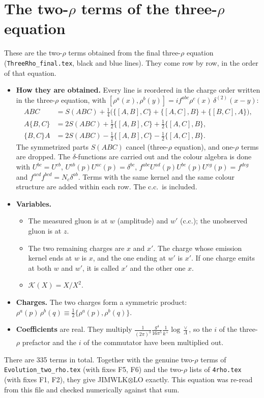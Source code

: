 \documentclass[9pt]{article}
\begin{document}
\section*{The two-$\rho$ terms of the three-$\rho$ equation}
These are the two-$\rho$ terms obtained from the final three-$\rho$ equation (\texttt{ThreeRho\_final.tex}, black and blue lines). They come row by row, in the order of that equation.
\begin{itemize}
\item \textbf{How they are obtained.} Every line is reordered in the charge order written in the three-$\rho$ equation, with $[\rho^a(x),\rho^b(y)]=if^{abc}\rho^c(x)\,\delta^{(2)}(x-y)$:
\begin{align*}
ABC&=S(ABC)+\tfrac14\big(\{[A,B],C\}+\{[A,C],B\}+\{[B,C],A\}\big),\\
A\{B,C\}&=2S(ABC)+\tfrac12\{[A,B],C\}+\tfrac12\{[A,C],B\},\\
\{B,C\}A&=2S(ABC)-\tfrac12\{[A,B],C\}-\tfrac12\{[A,C],B\}.
\end{align*}
The symmetrized parts $S(ABC)$ cancel (three-$\rho$ equation), and one-$\rho$ terms are dropped. The $\delta$-functions are carried out and the colour algebra is done with $U^{bc}=U^{cb}$, $U^{ab}(p)U^{ac}(p)=\delta^{bc}$, $f^{abc}U^{ad}(p)U^{be}(p)U^{cg}(p)=f^{deg}$ and $f^{acd}f^{bcd}=N_c\delta^{ab}$. Terms with the same kernel and the same colour structure are added within each row. The c.c.\ is included.
\item \textbf{Variables.}
\begin{itemize}
\item The measured gluon is at $w$ (amplitude) and $w'$ (c.c.); the unobserved gluon is at $z$.
\item The two remaining charges are $x$ and $x'$. The charge whose emission kernel ends at $w$ is $x$, and the one ending at $w'$ is $x'$. If one charge emits at both $w$ and $w'$, it is called $x'$ and the other one $x$.
\item $\mathcal K(X)=X/X^2$.
\end{itemize}
\item \textbf{Charges.} The two charges form a symmetric product: $\rho^a(p)\,\rho^b(q)\equiv\frac12\{\rho^a(p),\rho^b(q)\}$.
\item \textbf{Coefficients} are real. They multiply $\frac{1}{(2\pi)^3}\frac{g^4}{16\pi^5}\frac1{k^+}\log\frac\vee\Lambda$, so the $i$ of the three-$\rho$ prefactor and the $i$ of the commutator have been multiplied out.
\end{itemize}
There are 335 terms in total. Together with the genuine two-$\rho$ terms of \texttt{Evolution\_two\_rho.tex} (with fixes F5, F6) and the two-$\rho$ lists of \texttt{4rho.tex} (with fixes F1, F2), they give JIMWLK$\otimes$LO exactly. This equation was re-read from this file and checked numerically against that sum.
\end{document}
